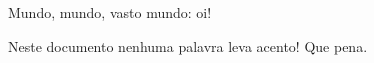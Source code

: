 \documentclass[12pt,a4paper]{memoir}
\begin{document}
Mundo, mundo, vasto mundo: oi!

Neste documento nenhuma palavra leva acento! Que pena.
\end{document}
